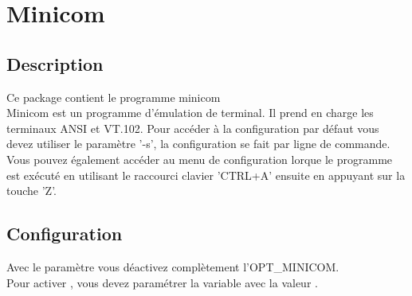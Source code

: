 {
\section {Minicom}
}

\subsection {Description}
  Ce package contient le programme minicom \\
  Minicom est un programme d'émulation de terminal. Il prend en charge les terminaux
  ANSI et VT.102. Pour accéder à la configuration par défaut vous devez utiliser le paramètre
  '-s', la configuration se fait par ligne de commande. Vous pouvez également accéder au menu
  de configuration lorque le programme est exécuté en utilisant le raccourci clavier 'CTRL+A'
  ensuite en appuyant sur la touche 'Z'.

\subsection{Configuration}

\begin{description}

  Avec le paramètre  vous déactivez complètement l'OPT\_MINICOM.\\
  Pour activer , vous devez paramétrer la variable 
  avec la valeur .

\end{description}
